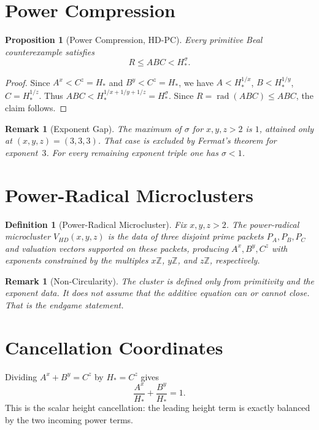 \documentclass[11pt,a4paper]{article}
\DeclareMathOperator{\rad}{rad}
\newtheorem{proposition}[theorem]{Proposition}
\newtheorem{definition}[theorem]{Definition}
\newtheorem{remark}[theorem]{Remark}
\begin{document}
\section{Power Compression}

\begin{proposition}[Power Compression, HD-PC]
\label{prop:compression}
Every primitive Beal counterexample satisfies
\[
  R \le ABC < H_*^{\sigma}.
\]
\end{proposition}

\begin{proof}
Since $A^x < C^z=H_*$ and $B^y < C^z=H_*$, we have
$A < H_*^{1/x}$, $B < H_*^{1/y}$, $C=H_*^{1/z}$. Thus
$ABC < H_*^{1/x+1/y+1/z}=H_*^{\sigma}$. Since $R=\rad(ABC)\le ABC$,
the claim follows.
\end{proof}

\begin{remark}[Exponent Gap]
The maximum of $\sigma$ for $x,y,z>2$ is $1$, attained only at
$(x,y,z)=(3,3,3)$. That case is excluded by Fermat's theorem for
exponent~$3$. For every remaining exponent triple one has $\sigma<1$.
\end{remark}

\section{Power-Radical Microclusters}

\begin{definition}[Power-Radical Microcluster]
Fix $x,y,z>2$. The power-radical microcluster $V_{HD}(x,y,z)$ is the
data of three disjoint prime packets $P_A, P_B, P_C$ and valuation
vectors supported on these packets, producing $A^x, B^y, C^z$ with
exponents constrained by the multiples $x\mathbb Z$, $y\mathbb Z$, and
$z\mathbb Z$, respectively.
\end{definition}

\begin{remark}[Non-Circularity]
The cluster is defined only from primitivity and the exponent data.
It does not assume that the additive equation can or cannot close.
That is the endgame statement.
\end{remark}

\section{Cancellation Coordinates}

Dividing $A^x+B^y=C^z$ by $H_*=C^z$ gives
\[
  \frac{A^x}{H_*}+\frac{B^y}{H_*}=1.
\]
This is the scalar height cancellation: the leading height term is
exactly balanced by the two incoming power terms.
\end{document}
